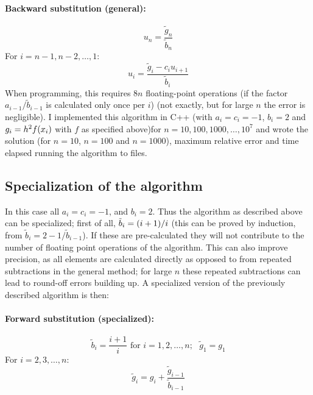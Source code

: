 \documentclass[a4paper,english]{article}
\let\originalleft\left
\let\originalright\right
\renewcommand{\left}{\mathopen{}\mathclose\bgroup\originalleft}
\renewcommand{\right}{\aftergroup\egroup\originalright}
\begin{document}
\paragraph{Backward substitution (general):}
\begin{equation}
  u_n = \frac{\tilde{g}_n}{\tilde{b}_n}
\end{equation}
For $i = n-1, n-2, \dots, 1$:
\begin{equation}
  u_i = \frac{\tilde{g}_i-c_iu_{i+1}}{\tilde{b}_i}
\end{equation}
When programming, this requires $8n$ floating-point operations (if the factor $a_{i-1}/\tilde{b}_{i-1}$ is calculated only once per $i$) (not exactly, but for large $n$ the error is negligible). I implemented this algorithm in C++ (with $a_i = c_i = -1$, $b_i = 2$ and $g_i = h^2f\left(x_i\right)$ with $f$ as specified above)for $n = 10,100,1000,\dots,10^7$ and wrote the solution (for $n=10$, $n=100$ and $n=1000$), maximum relative error and time elapsed running the algorithm to files.
\subsection{Specialization of the algorithm}
In this case all $a_i = c_i = -1$, and $b_i = 2$. Thus the algorithm as described above can be specialized; first of all, $\tilde{b}_i = \left(i+1\right)/i$ (this can be proved by induction, from $\tilde{b}_i = 2-1/\tilde{b}_{i-1}$). If these are pre-calculated they will not contribute to the number of floating point operations of the algorithm. This can also improve precision, as all elements are calculated directly as opposed to from repeated subtractions in the general method; for large $n$ these repeated subtractions can lead to round-off errors building up. A specialized version of the previously described algorithm is then:
\paragraph{Forward substitution (specialized):}
\begin{equation}
  \tilde{b}_i = \frac{i+1}{i} \text{ for }i=1,2,\dots,n;\text{ }\tilde{g}_1 = g_1
\end{equation}
For $i = 2,3,\dots,n$:
\begin{equation}
  \tilde{g}_i = g_i+\frac{\tilde{g}_{i-1}}{\tilde{b}_{i-1}}
\end{equation}
\end{document}
